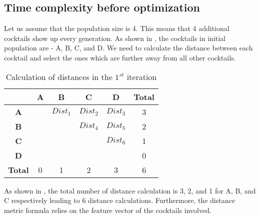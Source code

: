\subsection{Time complexity before optimization}\label{sec:GA-runtime-initial-bigO}


Let us assume that the population size is 4. This means that 4 additional cocktails show up every generation. As shown in , the cocktails in initial population are - A, B, C, and D. We need to calculate the distance between each cocktail and select the ones which are further away from all  other cocktails. %

\begin{table}[htbp]
\begin{center}
\caption{Calculation of distances in the $1^{st}$ iteration}
\begin{tabular}{|c|c|c|c|c|c|}
\hline
 & \textbf{A} & \textbf{B} & \textbf{C} & \textbf{D} & \textbf{Total} \\
\hline
\textbf{A} &  & $Dist_{1}$ & $Dist_{2}$ & $Dist_{3}$ & 3 \\
\hline
\textbf{B} & & & $Dist_{4}$ & $Dist_{5}$ & 2 \\
\hline
\textbf{C} &  &  &  & $Dist_{6}$ & 1 \\
\hline
\textbf{D} &  &  &  &   & 0 \\
\hline
\textbf{Total} & 0 & 1 & 2 & 3 & 6 \\
\hline
\end{tabular}
\label{iteration_1_methodology_table}
\end{center}
\end{table}

As shown in , the total number of distance calculation is 3, 2, and 1 for A, B, and C respectively leading  to 6 distance calculations. Furthermore, the distance metric formula relies on the feature vector of the cocktails involved. 

